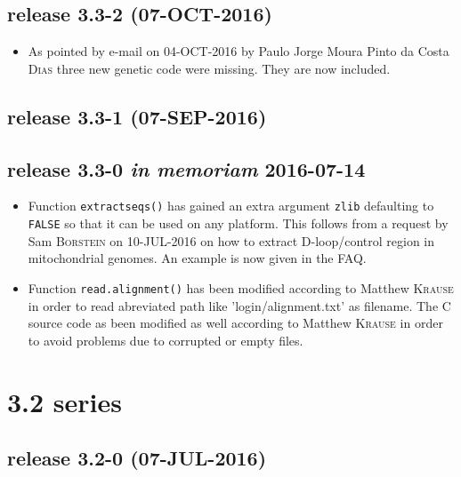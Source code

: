 \documentclass{article}
\begin{document}
\subsection*{release 3.3-2 (07-OCT-2016)}

\begin{itemize}

\item As pointed by e-mail on 04-OCT-2016 by Paulo Jorge Moura Pinto da Costa \textsc{Dias} three new genetic code were missing. They are now included.
\end{itemize}

\subsection*{release 3.3-1 (07-SEP-2016)}

\subsection*{release 3.3-0 \textit{in memoriam} 2016-07-14}

\begin{itemize}

\item Function \texttt{extractseqs()} has gained an extra argument \texttt{zlib}
defaulting to \texttt{FALSE} so that it can be used on any platform. This follows
from a request by Sam \textsc{Borstein} on 10-JUL-2016 on how to extract D-loop/control
region in mitochondrial genomes. An example is now given in the FAQ.

\item Function \texttt{read.alignment()} has been modified according to Matthew \textsc{Krause} in order to read abreviated path like '\texttildelow{}login/alignment.txt' as  filename. The C source code as been modified as well according to Matthew \textsc{Krause} in order to avoid  problems due to corrupted or empty files.

\end{itemize}

\section*{3.2 series}

\subsection*{release 3.2-0 (07-JUL-2016)}
\end{document}
